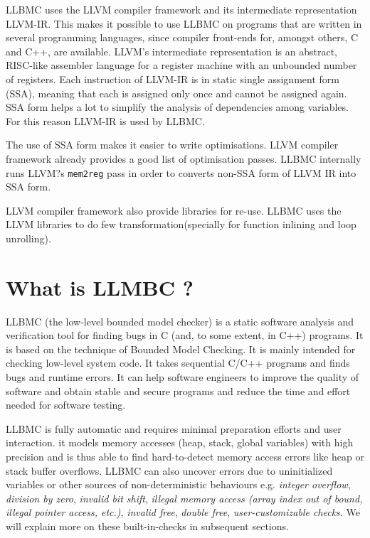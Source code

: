 \documentclass[14pt]{article}
\begin{document}
{LLBMC uses the LLVM compiler framework and its intermediate representation LLVM-IR. This makes it possible to use LLBMC
on programs that are written in several programming languages, since compiler front-ends for, amongst others, C and C++, are available. LLVM's intermediate representation is an abstract, RISC-like assembler language for a register machine with an unbounded number of registers. Each instruction of LLVM-IR is in static single assignment form (SSA), meaning that each is assigned only once and cannot be assigned again. SSA form helps a lot to simplify the analysis of dependencies among variables. For this reason LLVM-IR is used by LLBMC.

The use of SSA form makes it easier to write optimisations. LLVM compiler framework already provides a good list of optimisation passes. LLBMC internally runs LLVM?s \texttt{mem2reg} pass in order to converts non-SSA form of LLVM IR into SSA form. 

LLVM compiler framework also provide libraries for re-use. LLBMC uses the LLVM libraries to do few transformation(specially for  function inlining and loop unrolling). 



\section{What is LLMBC ?}\label{overview_of_llbmc}
LLBMC (the low-level bounded model checker) is a static software analysis and verification tool for finding bugs in C (and, to some extent, in C++) programs. It is based on the technique of Bounded Model Checking. It is mainly intended for checking low-level system code. It takes sequential C/C++ programs and finds bugs and runtime errors. It can help 
software engineers to improve the quality of software and obtain stable and secure programs and reduce the time and effort needed for software testing. 

LLBMC is fully automatic and requires minimal preparation efforts and user interaction. it models memory accesses (heap, stack, global variables) with high precision and is thus able to find hard-to-detect memory access errors like heap or stack buffer overflows. LLBMC can also uncover errors due to uninitialized variables or other sources of non-deterministic behaviours e.g. 
\textit{integer overflow}, 
\textit{division by zero},
\textit{invalid bit shift},
\textit{illegal memory access (array index out of bound, illegal pointer access, etc.)},
\textit{invalid free},
\textit{double free},
\textit{user-customizable checks}.
We will explain more on these built-in-checks in subsequent sections. 

}
\end{document}
